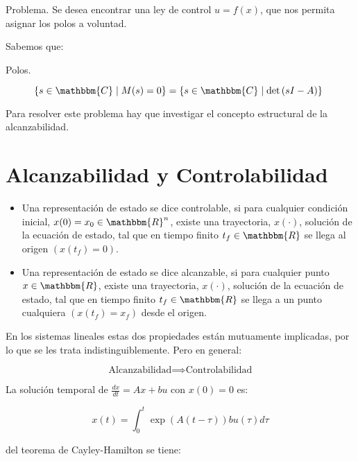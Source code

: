     Problema. Se desea encontrar una ley de control $u = f(x)$, que nos permita asignar los polos a voluntad.

    Sabemos que:

    \begin{description}
        \item [Polos.] $\left\{ s \in \mathbbm{C} \mid M(s) = 0 \right\} = \left\{ s \in \mathbbm{C} \mid \det{(sI - A)} \right\}$
    \end{description}

    Para resolver este problema hay que investigar el concepto estructural de la alcanzabilidad.

    \section{Alcanzabilidad y Controlabilidad}

        \begin{itemize}
            \item Una representación de estado se dice controlable, si para cualquier condición inicial, $x(0) = x_0 \in \mathbbm{R}^n$, existe una trayectoria, $x(\cdot)$, solución de la ecuación de estado, tal que en tiempo finito $t_f \in \mathbbm{R}$ se llega al origen $\left( x(t_f) = 0 \right)$.
            \item Una representación de estado se dice alcanzable, si para cualquier punto $x \in \mathbbm{R}$, existe una trayectoria, $x(\cdot)$, solución de la ecuación de estado, tal que en tiempo finito $t_f \in \mathbbm{R}$ se llega a un punto cualquiera $\left( x(t_f) = x_f \right)$ desde el origen.
        \end{itemize}

        En los sistemas lineales estas dos propiedades están mutuamente implicadas, por lo que se les trata indistinguiblemente. Pero en general:

        \begin{equation}
            \text{Alcanzabilidad} \implies \text{Controlabilidad}
        \end{equation}

        La solución temporal de $\frac{dx}{dt} = Ax + bu$ con $x(0) = 0$ es:

        \begin{equation}
            x(t) = \int_0^t \exp{(A(t - \tau))} b u(\tau) d \tau
        \end{equation}

        del teorema de Cayley-Hamilton se tiene:

